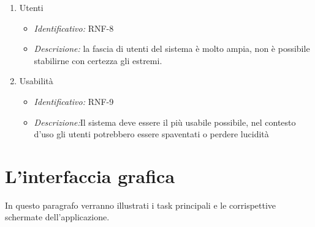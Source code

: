 \begin{enumerate}
\item Utenti
  \begin{itemize}
  \item\textit{Identificativo:} RNF-8
  \item\textit{Descrizione:} la fascia di utenti del sistema è molto ampia, non è possibile stabilirne con certezza gli estremi.
  \end{itemize}
  
  \item Usabilità
  \begin{itemize}
  \item\textit{Identificativo:} RNF-9
  \item\textit{Descrizione:}Il sistema deve essere il più usabile possibile, nel contesto d’uso gli utenti potrebbero essere spaventati o perdere lucidità
  \end{itemize}
  
\end{enumerate}

\section{L'interfaccia grafica}
In questo paragrafo verranno illustrati i task principali e le corrispettive schermate dell'applicazione.

